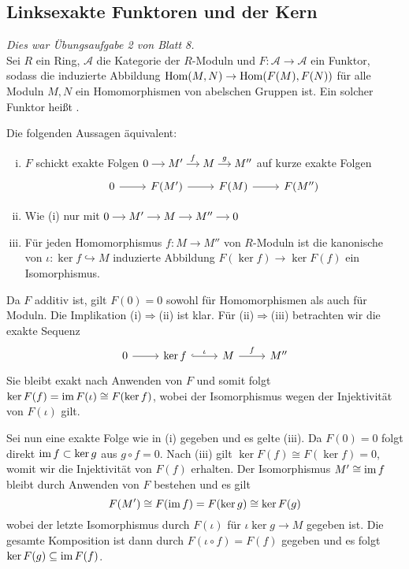 \subsection{Linksexakte Funktoren und der Kern} %
\label{sub:exakte_funktoren_und_der_kern}
\emph{Dies war Übungsaufgabe 2 von Blatt 8.}\smallskip \\
Sei $R$ ein Ring, $\mathcal{A}$ die Kategorie der $R$-Moduln und $F \colon \mathcal{A} \to \mathcal{A}$ ein Funktor, sodass die induzierte Abbildung $\Hom(M,N) \to \Hom \enbrace*{F(M), F(N)}$ für alle Moduln $M,N$ ein Homomorphismen von abelschen Gruppen ist. 
Ein solcher Funktor heißt .

Die folgenden Aussagen äquivalent:
\begin{enumerate}[(i)]
	\item $F$ schickt exakte Folgen $ \begin{tikzcd}[cramped,sep=small]
		0 \rar & M' \rar["f"] & M \rar["g"] & M''
	\end{tikzcd}$ auf kurze exakte Folgen
	\[
		\begin{tikzcd}
			0 \rar & F(M') \rar & F(M) \rar & F(M'')
		\end{tikzcd}
	\]
	\item Wie (i) nur mit 
	\(
		\begin{tikzcd}[cramped,sep=small]
			0 \rar & M' \rar & M \rar & M'' \rar & 0
		\end{tikzcd}
	\)
	\item Für jeden Homomorphismus $f \colon M \to M''$ von $R$-Moduln ist die kanonische von $\iota \colon \ker f \hookrightarrow M$ induzierte Abbildung $F(\ker f) \to \ker F(f)$ ein Isomorphismus.
\end{enumerate}
\begin{beweis}
	Da $F$ additiv ist, gilt $F(0)=0$ sowohl für Homomorphismen als auch für Moduln. 
	Die Implikation (i)$\Rightarrow$(ii) ist klar.
	Für (ii)$\Rightarrow$(iii) betrachten wir die exakte Sequenz
	\[
		\begin{tikzcd}
			0 \rar & \ker f \rar[hook,"\iota"] & M \rar["f"] & M''
		\end{tikzcd}
	\]
	Sie bleibt exakt nach Anwenden von $F$ und somit folgt $\ker F(f) = \operatorname{im} F(\iota) \cong F(\ker f)$, wobei der Isomorphismus wegen der Injektivität von $F(\iota)$ gilt.
	
	Sei nun eine exakte Folge wie in (i) gegeben und es gelte (iii).
	Da $F(0)=0$ folgt direkt $\operatorname{im} f \subset \ker g$ aus $g \circ f =0$.
	Nach (iii) gilt $\ker F(f) \cong F(\ker f) = 0$, womit wir die Injektivität von $F(f)$ erhalten.
	Der Isomorphismus $M' \cong \operatorname{im} f$ bleibt durch Anwenden von $F$ bestehen und es gilt
	\[
		F(M') \cong F(\operatorname{im} f) = F(\ker g) \cong \ker F(g)
	\]
	wobei der letzte Isomorphismus durch $F(\iota)$ für $\iota \ker g \to M$ gegeben ist.
	Die gesamte Komposition ist dann durch $F(\iota \circ f) = F(f)$ gegeben und es folgt $\ker F(g) \subseteq \operatorname{im} F(f)$.
\end{beweis}
